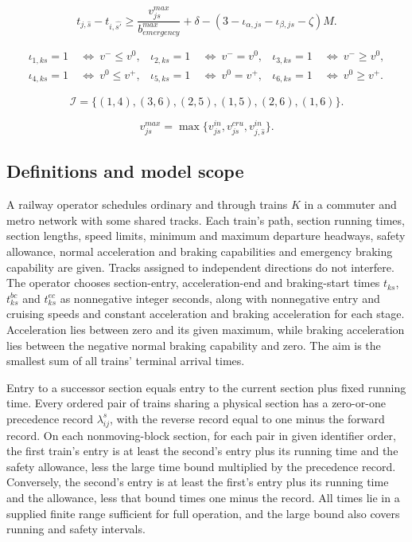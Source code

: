 \documentclass[10pt]{article}
\begin{document}
\[
t_{j,\widehat s}-t_{i,\widehat{s'}}
\ge \frac{v^{max}_{js}}{b^{max}_{emergency}}+\delta
 -(3-\iota_{\alpha,js}-\iota_{\beta,js}-\zeta)M.
\]

\begin{align*}
\iota_{1,ks}=1&\ \Longleftrightarrow\ v^-\le v^0,&
\iota_{2,ks}=1&\ \Longleftrightarrow\ v^-=v^0,&
\iota_{3,ks}=1&\ \Longleftrightarrow\ v^-\ge v^0,\\
\iota_{4,ks}=1&\ \Longleftrightarrow\ v^0\le v^+,&
\iota_{5,ks}=1&\ \Longleftrightarrow\ v^0=v^+,&
\iota_{6,ks}=1&\ \Longleftrightarrow\ v^0\ge v^+ .
\end{align*}

\[
\mathcal I=\{(1,4),(3,6),(2,5),(1,5),(2,6),(1,6)\}.
\]

\[
v^{max}_{js}=\max\{v^{in}_{js},v^{cru}_{js},v^{in}_{j,\widehat s}\}.
\]

\subsection*{Definitions and model scope}
A railway operator schedules ordinary and through trains $K$ in a commuter and metro network with some shared tracks. Each train's path, section running times, section lengths, speed limits, minimum and maximum departure headways, safety allowance, normal acceleration and braking capabilities and emergency braking capability are given. Tracks assigned to independent directions do not interfere. The operator chooses section-entry, acceleration-end and braking-start times $t_{ks}$, $t^{bc}_{ks}$ and $t^{ec}_{ks}$ as nonnegative integer seconds, along with nonnegative entry and cruising speeds and constant acceleration and braking acceleration for each stage. Acceleration lies between zero and its given maximum, while braking acceleration lies between the negative normal braking capability and zero. The aim is the smallest sum of all trains' terminal arrival times.

Entry to a successor section equals entry to the current section plus fixed running time. Every ordered pair of trains sharing a physical section has a zero-or-one precedence record $\lambda_{ij}^s$, with the reverse record equal to one minus the forward record. On each nonmoving-block section, for each pair in given identifier order, the first train's entry is at least the second's entry plus its running time and the safety allowance, less the large time bound multiplied by the precedence record. Conversely, the second's entry is at least the first's entry plus its running time and the allowance, less that bound times one minus the record. All times lie in a supplied finite range sufficient for full operation, and the large bound also covers running and safety intervals.
\end{document}
